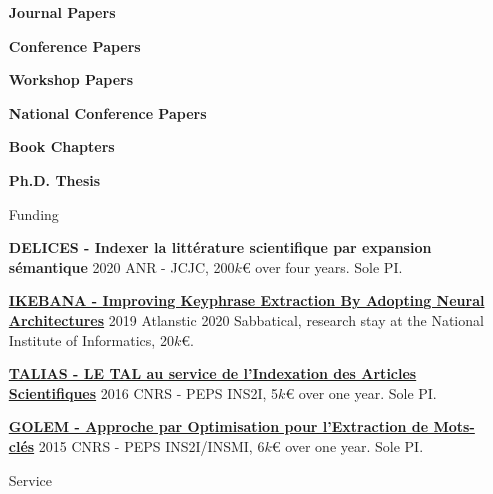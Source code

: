 \documentclass[11pt,a4paper]{article}
\begin{document}
\begin{itemize}
\vspace{1em}

\nocite{*}

\textbf{Journal Papers}
\printbibliography[heading=none,type=article]


\textbf{Conference Papers}
\printbibliography[heading=none,type=inproceedings,keyword=intConf]

\textbf{Workshop Papers}
\printbibliography[heading=none,type=inproceedings,keyword=workshop]

\textbf{National Conference Papers}
\printbibliography[heading=none,type=inproceedings,keyword=natConf]

\textbf{Book Chapters}
\printbibliography[heading=none,type=inbook]

\textbf{Ph.D. Thesis}
\printbibliography[heading=none,type=thesis]

\item[Funding]

\textbf{DELICES - Indexer la littérature scientifique par expansion sémantique} \hfill 2020 \newline
ANR - JCJC, 200$k$\euro{} over four years. Sole PI.

\href{https://ikebana-project.github.io/}{\textbf{IKEBANA - Improving Keyphrase Extraction By Adopting Neural
Architectures}} \hfill 2019 \newline
Atlanstic 2020 Sabbatical, research stay at the National Institute of Informatics, 20$k$\euro{}.

\href{http://boudinfl.github.io/talias/}{\textbf{TALIAS - LE TAL au service de
l'Indexation des Articles Scientifiques}} \hfill 2016 \newline
CNRS - PEPS INS2I, 5$k$\euro{} over one year. Sole PI.

\href{http://boudinfl.github.io/golem/}{\textbf{GOLEM - Approche par Optimisation
pour l'Extraction de Mots-clés}} \hfill 2015 \newline
CNRS - PEPS INS2I/INSMI, 6$k$\euro{} over one year. Sole PI.

\item[Service]
\begin{itemize}[
font=\normalfont\bfseries,
itemsep=.1cm,
wide=0cm,
labelsep*=.1cm]


\end{itemize}
\end{itemize}
\end{document}
